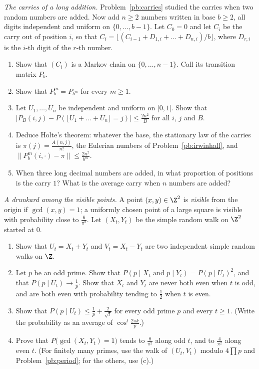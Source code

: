 \begin{exercise}[$\star\star\star$]\label{pb:holte}
\emph{The carries of a long addition.} Problem~\ref{pb:carries} studied the carries when two random numbers are added. Now add $n\ge2$
numbers written in base $b\ge2$, all digits independent and uniform on $\{0,\dots,b-1\}$. Let $C_0=0$ and let $C_i$ be the carry out of position
$i$, so that $C_i=\lfloor(C_{i-1}+D_{1,i}+\dots+D_{n,i})/b\rfloor$, where $D_{r,i}$ is the $i$-th digit of the $r$-th number.
\begin{enumerate}[label=(\alph*)]
\item Show that $(C_i)$ is a Markov chain on $\{0,\dots,n-1\}$. Call its transition matrix $P_b$.
\item Show that $P_b^m=P_{b^m}$ for every $m\ge1$.
\item Let $U_1,\dots,U_n$ be independent and uniform on $[0,1[$. Show that $|P_B(i,j)-P(\lfloor U_1+\dots+U_n\rfloor=j)|\le\frac{2n^2}B$ for all $i$, $j$ and $B$.
\item Deduce Holte's theorem: whatever the base, the stationary law of the carries is $\pi(j)=\frac{A(n,j)}{n!}$, the Eulerian numbers of
Problem~\ref{pb:irwinhall}, and $\|P_b^m(i,\cdot)-\pi\|\le\frac{2n^2}{b^m}$.
\item When three long decimal numbers are added, in what proportion of positions is the carry $1$? What is the average carry when $n$
numbers are added?
\end{enumerate}
\end{exercise}

\begin{exercise}[Journey]\label{pb:coprimewalk}
\emph{A drunkard among the visible points.} A point $(x,y)\in\Z^2$ is \emph{visible} from the origin if $\gcd(x,y)=1$; a uniformly chosen point of a
large square is visible with probability close to $\frac6{\pi^2}$. Let $(X_t,Y_t)$ be the simple random walk on $\Z^2$ started at $0$.
\begin{enumerate}[label=(\alph*)]
\item Show that $U_t=X_t+Y_t$ and $V_t=X_t-Y_t$ are two independent simple random walks on $\Z$.
\item Let $p$ be an odd prime. Show that $P(p\mid X_t\text{ and }p\mid Y_t)=P(p\mid U_t)^2$, and that $P(p\mid U_t)\to\frac1p$. Show that $X_t$ and $Y_t$ are never both even when $t$ is
odd, and are both even with probability tending to $\frac12$ when $t$ is even.
\item Show that $P(p\mid U_t)\le\frac1p+\frac2{\sqrt t}$ for every odd prime $p$ and every $t\ge1$. (Write the probability as an average of $\cos^t\frac{2\pi k}p$.)
\item Prove that $P\bigl(\gcd(X_t,Y_t)=1\bigr)$ tends to $\frac8{\pi^2}$ along odd $t$, and to $\frac4{\pi^2}$ along even $t$. (For finitely many primes, use the walk of $(U_t,V_t)$
modulo $4\prod p$ and Problem~\ref{pb:period}; for the others, use (c).)
\end{enumerate}
\end{exercise}

